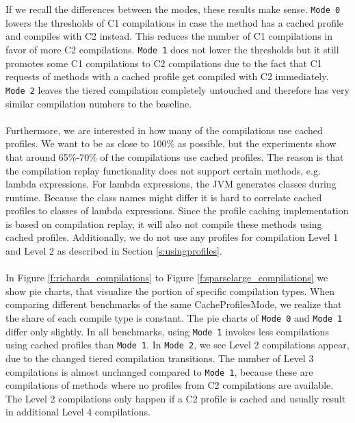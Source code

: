 \\\\
If we recall the differences between the modes, these results make sense. \texttt{Mode 0} lowers the thresholds of C1 compilations in case the method has a cached profile and compiles with C2 instead. This reduces the number of C1 compilations in favor of more C2 compilations. \texttt{Mode 1} does not lower the thresholds but it still promotes some C1 compilations to C2 compilations due to the fact that C1 requests of methods with a cached profile get compiled with C2 immediately.
\texttt{Mode 2} leaves the tiered compilation completely untouched and therefore has very similar compilation numbers to the baseline.
\\\\
Furthermore, we are interested in how many of the compilations use cached profiles. We want to be as close to 100\% as possible, but the experiments show that around 65\%-70\% of the compilations use cached profiles.
The reason is that the compilation replay functionality does not support certain methods, e.g. lambda expressions. For lambda expressions, the JVM generates classes during runtime. Because the class names might differ it is hard to correlate cached profiles to classes of lambda expressions. Since the profile caching implementation is based on compilation replay, it will also not compile these methods using cached profiles. 
Additionally, we do not use any profiles for compilation Level 1 and Level 2 as described in Section \ref{s:usingprofiles}.
\\\\
In Figure \ref{f:richards_compilations} to Figure \ref{f:sparselarge_compilations} we show pie charts, that visualize the portion of specific compilation types.
When comparing different benchmarks of the same CacheProfilesMode, we realize that the share of each compile type is constant.
The pie charts of \texttt{Mode 0} and \texttt{Mode 1} differ only slightly. In all benchmarks, using \texttt{Mode 1} invokes less compilations using cached profiles than \texttt{Mode 1}.
In \texttt{Mode 2}, we see Level 2 compilations appear, due to the changed tiered compilation transitions. The number of Level 3 compilations is almost unchanged compared to \texttt{Mode 1}, because these are compilations of methods where no profiles from C2 compilations are available.
The Level 2 compilations only happen if a C2 profile is cached and usually result in additional Level 4 compilations. 
